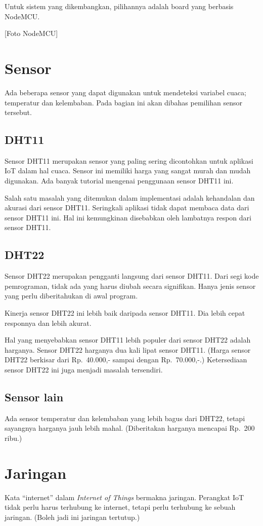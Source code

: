 \documentclass[
10pt, %
a4paper, %
oneside, %
headinclude,footinclude, %
BCOR5mm, %
]{scrartcl}
\begin{document}
Untuk sistem yang dikembangkan, pilihannya adalah board yang berbasis NodeMCU.

[Foto NodeMCU]

\section{Sensor}
Ada beberapa sensor yang dapat digunakan untuk mendeteksi variabel cuaca;
temperatur dan kelembaban. Pada bagian ini akan dibahas pemilihan sensor
tersebut.

\subsection{DHT11}
Sensor DHT11 merupakan sensor yang paling sering dicontohkan untuk aplikasi IoT
dalam hal cuaca. Sensor ini memiliki harga yang sangat murah dan mudah
digunakan. Ada banyak tutorial mengenai penggunaan sensor DHT11 ini.

Salah satu masalah yang ditemukan dalam implementasi adalah kehandalan dan
akurasi dari sensor DHT11. Seringkali aplikasi tidak dapat membaca data dari
sensor DHT11 ini. Hal ini kemungkinan disebabkan oleh lambatnya respon dari
sensor DHT11.

\subsection{DHT22}
Sensor DHT22 merupakan pengganti langsung dari sensor DHT11. Dari segi kode
pemrograman, tidak ada yang harus diubah secara signifikan. Hanya jenis sensor
yang perlu diberitahukan di awal program.

Kinerja sensor DHT22 ini lebih baik daripada sensor DHT11. Dia lebih cepat
responnya dan lebih akurat.

Hal yang menyebabkan sensor DHT11 lebih populer dari sensor DHT22 adalah
harganya. Sensor DHT22 harganya dua kali lipat sensor DHT11. (Harga sensor
DHT22 berkisar dari Rp.~40.000,- sampai dengan Rp.~70.000,-.) Ketersediaan
sensor DHT22 ini juga menjadi masalah tersendiri.

\subsection{Sensor lain}
Ada sensor temperatur dan kelembaban yang lebih bagus dari DHT22, tetapi
sayangnya harganya jauh lebih mahal. (Diberitakan harganya mencapai Rp.~200
ribu.)

\section{Jaringan}
Kata ``internet'' dalam {\em Internet of Things} bermakna jaringan. Perangkat
IoT tidak perlu harus terhubung ke internet, tetapi perlu terhubung ke sebuah
jaringan. (Boleh jadi ini jaringan tertutup.)
\end{document}
